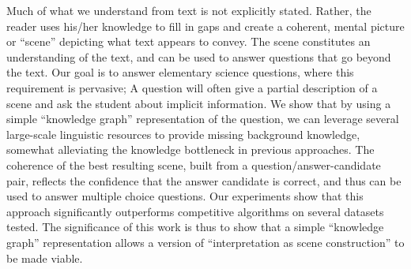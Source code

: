 Much of what we understand from text is not explicitly stated. Rather, the reader uses his/her knowledge to fill in gaps and create a coherent, mental picture or ``scene'' depicting what text appears to convey. The scene constitutes an understanding of the text, and can be used to answer questions that go beyond the text. Our goal is to answer elementary science questions, where this requirement is pervasive; A question will often give a partial description of a scene and ask the student about implicit information. We show that by using a simple ``knowledge graph'' representation of the question, we can leverage several large-scale linguistic resources to provide missing background knowledge, somewhat alleviating the knowledge bottleneck in previous approaches. The coherence of the best resulting scene, built from a question/answer-candidate pair, reflects the confidence that the answer candidate is correct, and thus can be used to answer multiple choice questions. Our experiments show that this approach significantly outperforms competitive algorithms on several datasets tested. The significance of this work is thus to show that a simple ``knowledge graph'' representation allows a version of ``interpretation as scene construction'' to be made viable.
